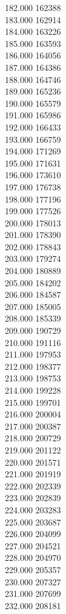 { 182.000	162388 \\
 183.000	162914 \\
 184.000	163226 \\
 185.000	163593 \\
 186.000	164056 \\
 187.000	164386 \\
 188.000	164746 \\
 189.000	165236 \\
 190.000	165579 \\
 191.000	165986 \\
 192.000	166433 \\
 193.000	166759 \\
 194.000	171269 \\
 195.000	171631 \\
 196.000	173610 \\
 197.000	176738 \\
 198.000	177196 \\
 199.000	177526 \\
 200.000	178013 \\
 201.000	178390 \\
 202.000	178843 \\
 203.000	179274 \\
 204.000	180889 \\
 205.000	184202 \\
 206.000	184587 \\
 207.000	185005 \\
 208.000	185339 \\
 209.000	190729 \\
 210.000	191116 \\
 211.000	197953 \\
 212.000	198377 \\
 213.000	198753 \\
 214.000	199228 \\
 215.000	199701 \\
 216.000	200004 \\
 217.000	200387 \\
 218.000	200729 \\
 219.000	201122 \\
 220.000	201571 \\
 221.000	201919 \\
 222.000	202339 \\
 223.000	202839 \\
 224.000	203283 \\
 225.000	203687 \\
 226.000	204099 \\
 227.000	204521 \\
 228.000	204970 \\
 229.000	205357 \\
 230.000	207327 \\
 231.000	207699 \\
 232.000	208181 \\
}
